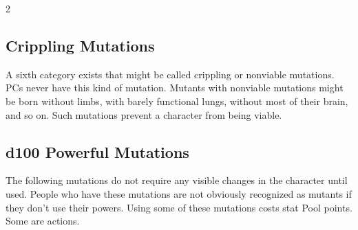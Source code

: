 \begin{multicols}{2}

\subsection{Crippling Mutations}

A sixth category exists that might be called crippling or nonviable mutations. PCs never have this kind of mutation. Mutants with nonviable mutations might be born without limbs, with barely functional lungs, without most of their brain, and so on. Such mutations prevent a character from being viable.

\subsection{d100 Powerful Mutations}

The following mutations do not require any visible changes in the character until used. People who have these mutations are not obviously recognized as mutants if they don’t use their powers. Using some of these mutations costs stat Pool points. Some are actions.

\end{multicols}


